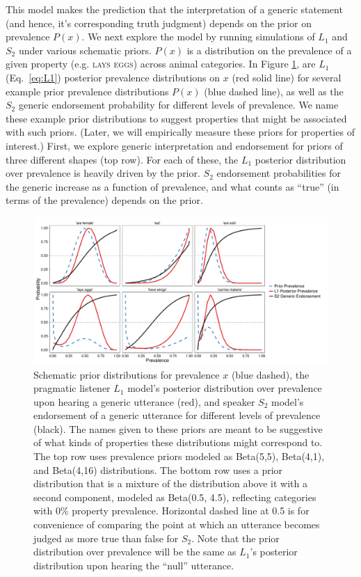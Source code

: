 \documentclass[12pt,letterpaper]{article}
\begin{document}
This model makes the prediction that the interpretation of a generic statement (and hence, it's corresponding truth judgment) depends on the prior on prevalence $P(x)$.
We next explore the model by running simulations of $L_1$ and $S_2$ under various schematic priors.
$P(x)$ is a distribution on the prevalence of a given property (e.g. \textsc{lays eggs}) across animal categories. 
In Figure \ref{fig:schematic-unif}, are $L_1$ (Eq.~\ref{eq:L1}) posterior prevalence distributions on $x$ (red solid line) for several example prior prevalence distributions $P(x)$ (blue dashed line), as well as the $S_2$ generic endorsement probability for different levels of prevalence.
We name these example prior distributions to suggest properties that might be associated with such priors. 
(Later, we will empirically measure these priors for properties of interest.)
First, we explore generic interpretation and endorsement for priors of three different shapes (top row). 
For each of these, the $L_1$ posterior distribution over prevalence is heavily driven by the prior.
$S_2$ endorsement probabilities for the generic increase as a function of prevalence, and what counts as ``true'' (in terms of the prevalence) depends on the prior. 

\begin{figure}
\centering
    \includegraphics[width=\columnwidth]{schematics_s2.pdf}
    \caption{Schematic prior distributions for prevalence $x$ (blue dashed), the pragmatic listener $L_1$ model's posterior distribution over prevalence upon hearing a generic utterance (red), and speaker $S_2$ model's endorsement of a generic utterance for different levels of prevalence (black).
    The names given to these priors are meant to be suggestive of what kinds of properties these distributions might correspond to.
    The top row uses prevalence priors modeled as Beta(5,5), Beta(4,1), and Beta(4,16) distributions.
      The bottom row uses a prior distribution that is a mixture of the distribution above it with a second component, modeled as Beta(0.5, 4.5), reflecting categories with 0\% property prevalence.
    Horizontal dashed line at 0.5 is for convenience of comparing the point at which an utterance becomes judged as more true than false for $S_2$.
	Note that the prior distribution over prevalence will be the same as $L_1$'s posterior distribution upon hearing the ``null'' utterance.
    }
  \label{fig:schematic-unif}
\end{figure}
\end{document}
